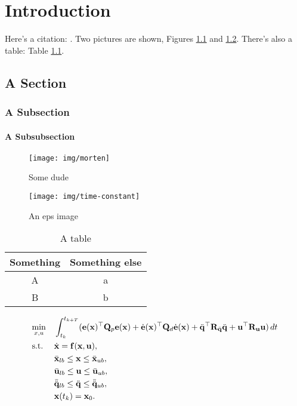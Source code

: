 \chapter{Introduction}\label{cha:introduction}
%
Here's a citation: \cite{Wacker2016}. Two pictures are shown, Figures \ref{fig:morten} and \ref{fig:eps}. There's also a table: Table \ref{tab:a-table}.

\section{A Section}\label{sec:a-section}

\subsection{A Subsection}\label{ssec:a-subsection}

\subsubsection{A Subsubsection}\label{sssec:a-subsubsection}

\lipsum[2]

\begin{figure}[htbp]
  \centering
  \texttt{[image: img/morten]}
  \caption{Some dude}
  \label{fig:morten}
\end{figure}

\begin{figure}[htbp]
  \centering
  \texttt{[image: img/time-constant]}
  \caption{An eps image}
  \label{fig:eps}
\end{figure}

\begin{table}[htbp]
  \centering
  \caption{A table}
  \begin{tabular}{cc}
    \toprule
    Something & Something else \\
    \midrule
    A & a \\
    B & b \\
    \bottomrule
  \end{tabular}
  \label{tab:a-table}
\end{table}

\begin{equation*}
  \begin{aligned}
      & \underset{x, u}{\text{min}}
      & & \int_{t_k}^{t_{k+T}} ( \mathbf{e}(\mathbf{x})^{\top} \mathbf{Q}_p \mathbf{e}(\mathbf{x}) +
      \dot{\mathbf{e}}(\mathbf{x})^{\top} \mathbf{Q}_d \dot{\mathbf{e}}(\mathbf{x}) +
      \ddot{\mathbf{q}}^{\top} \mathbf{R}_{\ddot{\mathbf{q}}} \ddot{\mathbf{q}} +
      \mathbf{u}^{\top} \mathbf{R}_{\mathbf{u}} \mathbf{u} ) \,dt\\
      & \text{s.t.}
      & & \dot{\mathbf{x}} = \mathbf{f}(\mathbf{x},\mathbf{u}), \\
      &&& \bar{\mathbf{x}}_{lb} \leq \mathbf{x} \leq \bar{\mathbf{x}}_{ub}, \\
      &&& \bar{\mathbf{u}}_{lb} \leq \mathbf{u} \leq \bar{\mathbf{u}}_{ub}, \\
      &&& \bar{\ddot{\mathbf{q}}}_{lb} \leq \ddot{\mathbf{q}} \leq \bar{\ddot{\mathbf{q}}}_{ub}, \\
      &&& \mathbf{x}(t_k) = \mathbf{x}_0. \\
      \end{aligned}
\end{equation*}